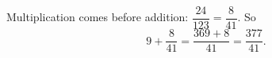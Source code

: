 Multiplication comes before addition: $\dfrac{24}{123}=\dfrac{8}{41}$. So
\[9+\dfrac{8}{41}=\dfrac{369+8}{41}=\boxed{\dfrac{377}{41}}.\]
